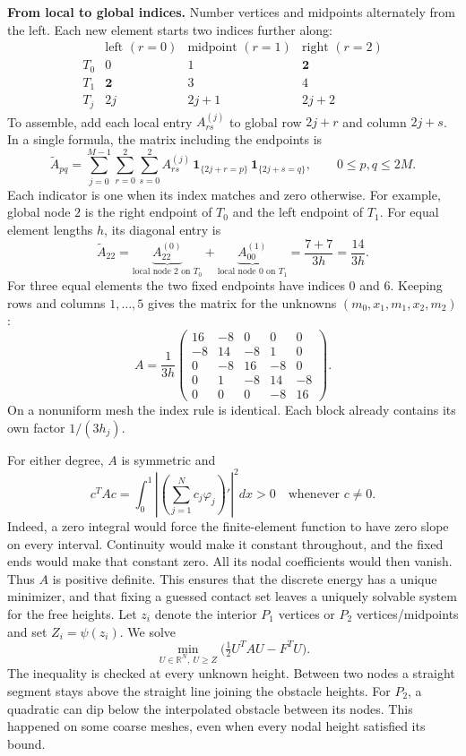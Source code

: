 \documentclass[11pt,a4paper]{article}
\newcommand{\R}{\mathbb R}
\begin{document}
\textbf{From local to global indices.}
Number vertices and midpoints alternately from the left. Each new element starts two indices further along:
\[
 \begin{array}{c|ccc}
 &\text{left }(r=0)&\text{midpoint }(r=1)&\text{right }(r=2)\\ \hline
 T_0 &0&1&\mathbf{2}\\
 T_1 &\mathbf{2}&3&4\\
 T_j &2j&2j+1&2j+2
 \end{array}
\]
To assemble, add each local entry $A^{(j)}_{rs}$ to global row $2j+r$ and column $2j+s$. In a single formula, the matrix including the endpoints is
\[
 \boxed{\displaystyle
 \widetilde A_{pq}
 =\sum_{j=0}^{M-1}\sum_{r=0}^{2}\sum_{s=0}^{2}
 A^{(j)}_{rs}\,\mathbf 1_{\{2j+r=p\}}\,\mathbf 1_{\{2j+s=q\}},}
 \qquad 0\le p,q\le 2M .
\]
Each indicator is one when its index matches and zero otherwise. For example, global node $2$ is the right endpoint of $T_0$ and the left endpoint of $T_1$. For equal element lengths $h$, its diagonal entry is
\[
 \widetilde A_{22}
 =\underbrace{A^{(0)}_{22}}_{\text{local node 2 on }T_0}
 +\underbrace{A^{(1)}_{00}}_{\text{local node 0 on }T_1}
 =\frac{7+7}{3h}=\frac{14}{3h}.
\]
For three equal elements the two fixed endpoints have indices $0$ and $6$.
Keeping rows and columns $1,\ldots,5$ gives the matrix for the unknowns $(m_0,x_1,m_1,x_2,m_2)$:
\[
 A
 =\frac1{3h}\begin{pmatrix}
 16&-8&0&0&0\\
 -8&14&-8&1&0\\
 0&-8&16&-8&0\\
 0&1&-8&14&-8\\
 0&0&0&-8&16
 \end{pmatrix}.
\]
On a nonuniform mesh the index rule is identical. Each block already contains its own factor $1/(3h_j)$.

For either degree, $A$ is symmetric and
\[
 c^TAc=\int_0^1\left|\left(\sum_{j=1}^N c_j\varphi_j\right)'\right|^2dx>0
 \quad\text{whenever }c\neq0.
\]
Indeed, a zero integral would force the finite-element function to have zero slope on every interval. Continuity would make it constant throughout, and the fixed ends would make that constant zero. All its nodal coefficients would then vanish. Thus $A$ is positive definite. This ensures that the discrete energy has a unique minimizer, and that fixing a guessed contact set leaves a uniquely solvable system for the free heights. Let $z_i$ denote the interior $P_1$ vertices or $P_2$ vertices/midpoints and set $Z_i=\psi(z_i)$. We solve
\begin{equation}\label{eq:discrete}
 \boxed{\min_{U\in\R^N,\ U\geq Z}\bigl(\tfrac12U^TAU-F^TU\bigr).}
\end{equation}
The inequality is checked at every unknown height. Between two nodes a straight segment stays above the straight line joining the obstacle heights. For $P_2$, a quadratic can dip below the interpolated obstacle between its nodes. This happened on some coarse meshes, even when every nodal height satisfied its bound.
\end{document}
